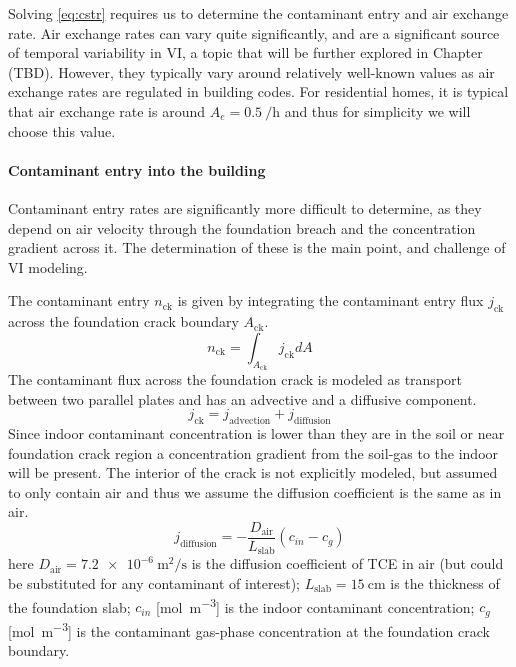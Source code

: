 Solving \eqref{eq:cstr} requires us to determine the contaminant entry and air exchange rate.
Air exchange rates can vary quite significantly, and are a significant source of temporal variability in VI, a topic that will be further explored in Chapter (TBD). %
However, they typically vary around relatively well-known values as air exchange rates are regulated in building codes.
For residential homes, it is typical that air exchange rate is around $A_e = \SI{0.5}{\per\hour}$ and thus for simplicity we will choose this value.\par

\paragraph{Contaminant entry into the building}

Contaminant entry rates are significantly more difficult to determine, as they depend on air velocity through the foundation breach and the concentration gradient across it.
The determination of these is the main point, and challenge of VI modeling.\par

The contaminant entry $n_\mathrm{ck}$ is given by integrating the contaminant entry flux $j_\mathrm{ck}$ across the foundation crack boundary $A_\mathrm{ck}$.
\begin{equation}
  n_\mathrm{ck} = \int_{A_\mathrm{ck}} j_\mathrm{ck} dA
\end{equation}
The contaminant flux across the foundation crack is modeled as transport between two parallel plates and has an advective and a diffusive component.
\begin{equation}
  j_\mathrm{ck} = j_\mathrm{advection} + j_\mathrm{diffusion}
\end{equation}
Since indoor contaminant concentration is lower than they are in the soil or near foundation crack region a concentration gradient from the soil-gas to the indoor will be present.
The interior of the crack is not explicitly modeled, but assumed to only contain air and thus we assume the diffusion coefficient is the same as in air.
\begin{equation}
  j_\mathrm{diffusion} = - \frac{D_\mathrm{air}}{L_\mathrm{slab}} (c_{in} - c_g)
\end{equation}
here $D_\mathrm{air} = \SI{7.2e-6}{\metre\squared\per\second}$ is the diffusion coefficient of TCE in air (but could be substituted for any contaminant of interest); %
$L_\mathrm{slab} = \SI{15}{\centi\metre}$ is the thickness of the foundation slab;
$c_{in}$ [\si{\mol\per\metre\cubed}] is the indoor contaminant concentration;
$c_g$ [\si{\mol\per\metre\cubed}] is the contaminant gas-phase concentration at the foundation crack boundary.\par

